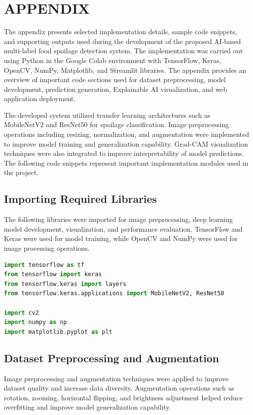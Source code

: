 \chapter*{APPENDIX}
\setcounter{section}{0}
\renewcommand{\thesection}{A.\arabic{section}}

The appendix presents selected implementation details, sample code snippets, and supporting outputs used during the development of the proposed AI-based multi-label food spoilage detection system. The implementation was carried out using Python in the Google Colab environment with TensorFlow, Keras, OpenCV, NumPy, Matplotlib, and Streamlit libraries. The appendix provides an overview of important code sections used for dataset preprocessing, model development, prediction generation, Explainable AI visualization, and web application deployment.

The developed system utilized transfer learning architectures such as MobileNetV2 and ResNet50 for spoilage classification. Image preprocessing operations including resizing, normalization, and augmentation were implemented to improve model training and generalization capability. Grad-CAM visualization techniques were also integrated to improve interpretability of model predictions. The following code snippets represent important implementation modules used in the project.

\section[Importing Required Libraries]{\textbf{Importing Required Libraries}}
The following libraries were imported for image preprocessing, deep learning model development, visualization, and performance evaluation. TensorFlow and Keras were used for model training, while OpenCV and NumPy were used for image processing operations.

\begin{lstlisting}[language=Python, caption=Importing Python libraries]
import tensorflow as tf
from tensorflow import keras
from tensorflow.keras import layers
from tensorflow.keras.applications import MobileNetV2, ResNet50

import cv2
import numpy as np
import matplotlib.pyplot as plt
\end{lstlisting}

\section[Dataset Preprocessing and Augmentation]{\textbf{Dataset Preprocessing and Augmentation}}
Image preprocessing and augmentation techniques were applied to improve dataset quality and increase data diversity. Augmentation operations such as rotation, zooming, horizontal flipping, and brightness adjustment helped reduce overfitting and improve model generalization capability.

